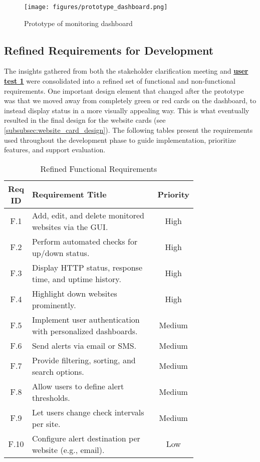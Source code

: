 \begin{figure}[H]
    \centering
    \texttt{[image: figures/prototype\_dashboard.png]}
    \caption{Prototype of monitoring dashboard}
    \label{fig:proto_dash}
\end{figure}



\subsection{Refined Requirements for Development}
\label{subsec:reqs_after_proto}

The insights gathered from both the stakeholder clarification meeting and \textbf{\hyperref[subsec:user_testing]{user test 1}} were consolidated into a refined set of functional and non-functional requirements.  One important design element that changed after the prototype was that we moved away from completely green or red cards on the dashboard, to instead display status in a more visually appealing way. This is what eventually resulted in the final design for the website cards (see \ref{subsubsec:website_card_design}). The following tables present the requirements used throughout the development phase to guide implementation, prioritize features, and support evaluation.


\begin{table}[H]
    \centering
    \caption{Refined Functional Requirements}
    \label{tab:functional_reqs_refined}
    \begin{tabular}{|c|>{\raggedright\arraybackslash}p{0.75\linewidth}|c|}
        \hline
        \textbf{Req ID} & \textbf{Requirement Title} & \textbf{Priority} \\
        \hline
        F.1 & Add, edit, and delete monitored websites via the GUI. & High \\
        \hline
        F.2 & Perform automated checks for up/down status. & High \\
        \hline
        F.3 & Display HTTP status, response time, and uptime history. & High \\
        \hline
        F.4 & Highlight down websites prominently. & High \\
        \hline
        F.5 & Implement user authentication with personalized dashboards. & Medium \\
        \hline
        F.6 & Send alerts via email or SMS. & Medium \\
        \hline
        F.7 & Provide filtering, sorting, and search options. & Medium \\
        \hline
        F.8 & Allow users to define alert thresholds. & Medium \\
        \hline
        F.9 & Let users change check intervals per site. & Medium \\
        \hline
        F.10 & Configure alert destination per website (e.g., email). & Low \\
        \hline
    \end{tabular}
\end{table}


